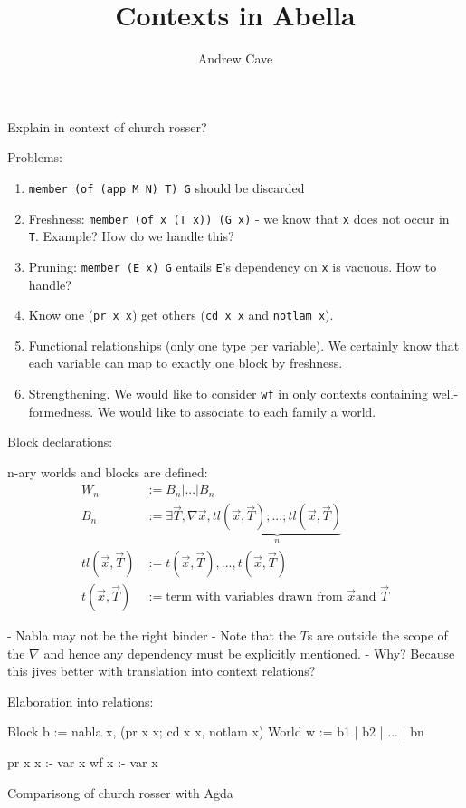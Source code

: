 \documentclass{article}
\title{Contexts in Abella}
\author{Andrew Cave}
\begin{document}
\maketitle
Explain in context of church rosser?

Problems:
\begin{enumerate}
\item {\tt member (of (app M N) T) G} should be discarded
\item Freshness: {\tt member (of x (T x)) (G x)} - we know that  {\tt x}
  does not occur in {\tt T}. Example? How do we handle this? 
\item Pruning: {\tt member (E x) G} entails {\tt E}'s dependency on
  {\tt x} is vacuous. How to handle?
\item Know one ({\tt pr x x}) get others ({\tt cd x x} and {\tt notlam x}).
\item Functional relationships (only one type per variable). We
  certainly know that each variable can map to exactly one block by
  freshness.
\item Strengthening. We would like to consider {\tt wf} in only
  contexts containing well-formedness. We would like to associate to
  each family a world.
\end{enumerate}

Block declarations:

n-ary worlds and blocks are defined: 
\begin{align*}
W_n &:= B_n | ... | B_n \\
B_n &:= \exists \vec{T}, \nabla \vec{x}, \underbrace{tl(\vec{x}, \vec{T}); ...;
tl(\vec{x}, \vec{T})}_{n} \\
tl(\vec{x}, \vec{T}) &:= t(\vec{x}, \vec{T}), ..., t(\vec{x}, \vec{T}) \\
t(\vec{x}, \vec{T}) &:= \text{term with variables drawn from } \vec{x} \text{
  and } \vec{T}
\end{align*}

- Nabla may not be the right binder
- Note that the $T$s are outside the scope of the $\nabla$ and hence
any dependency must be explicitly mentioned.
- Why? Because this jives better with translation into context
relations? 

Elaboration into relations:

Block b := nabla x, (pr x x; cd x x, notlam x)
World w := b1 | b2 | ... | bn

pr x x :- var x
wf x :- var x

Comparisong of church rosser with Agda
\end{document}

